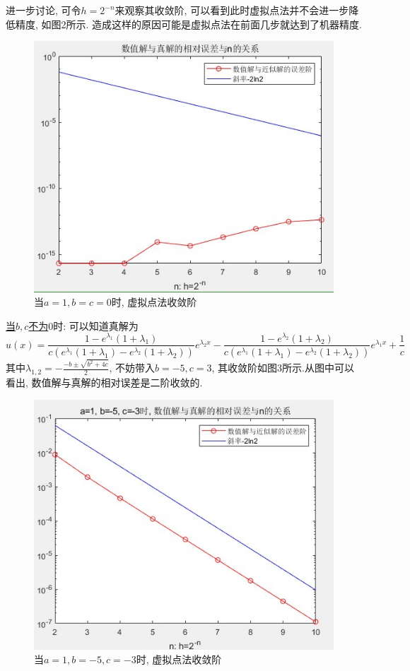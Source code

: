 \documentclass[12pt]{article}
\begin{document}
\noindent 进一步讨论, 可令$h=2^{-n}$来观察其收敛阶, 可以看到此时虚拟点法并不会进一步降低精度, 如图2所示. 造成这样的原因可能是虚拟点法在前面几步就达到了机器精度.
\begin{figure}[H]
	\centering
	\includegraphics[width=1\textwidth]{14}
	\caption{当$a=1, b=c=0$时, 虚拟点法收敛阶}
\end{figure}
\noindent \underline{当$b,c$不为$0$}时: 可以知道真解为$$u(x)=\frac{1-e^{\lambda_1}(1+\lambda_1)}{c(e^{\lambda_1}(1+\lambda_1)-e^{\lambda_2}(1+\lambda_2))}e^{\lambda_2 x}-    \frac{1-e^{\lambda_2}(1+\lambda_2)}{c(e^{\lambda_1}(1+\lambda_1)-e^{\lambda_2}(1+\lambda_2))}e^{\lambda_1 x}+\frac{1}{c}$$
\noindent  其中$\lambda_{1,2}=-\frac{-b \pm \sqrt{b^2+4c}}{2}$, 不妨带入$b=-5,c=3$, 其收敛阶如图3所示.从图中可以看出, 数值解与真解的相对误差是二阶收敛的.
\begin{figure}[H]
	\centering
	\includegraphics[width=1\textwidth]{15}
	\caption{当$a=1, b=-5,c=-3$时, 虚拟点法收敛阶}
\end{figure}
\end{document}
